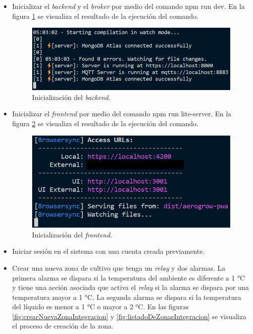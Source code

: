 \begin{itemize}
	\item Inicializar el \textit{backend} y el \textit{broker} por medio del comando npm run dev. En la figura \ref{fig:inicializacionBackendIntegracion} se visualiza el resultado de la ejecución del comando.

\begin{figure}[H]
	\centering
	\includegraphics[width=.9\textwidth]{./Figures/Backend inicializacion.png}
	\caption{Inicialización del \emph{backend}.}
	\label{fig:inicializacionBackendIntegracion}
\end{figure}

	\item Inicializar el \textit{frontend} por medio del comando npm run lite-server. En la figura \ref{fig:inicializacionFrontendIntegracion} se visualiza el resultado de la ejecución del comando.

\begin{figure}[H]
	\centering
	\includegraphics[width=.9\textwidth]{./Figures/Frontend inicializacion.png}
	\caption{Inicialización del \emph{frontend}.}
	\label{fig:inicializacionFrontendIntegracion}
\end{figure}

	\item Iniciar sesión en el sistema con una cuenta creada previamente.
	\item Crear una nueva zona de cultivo que tenga un \textit{relay} y dos alarmas. La primera alarma se dispara si la temperatura del ambiente es diferente a 1 °C y tiene una acción asociada que activa el \textit{relay} si la alarma se dispara por una temperatura mayor a 1 °C. La segunda alarma se dispara si la temperatura del líquido es menor a 1 °C o mayor a 2 °C. En las figuras \ref{fig:crearNuevaZonaIntegracion} y \ref{fig:listadoDeZonasIntegracion} se visualiza el proceso de creación de la zona.
	

\end{itemize}
